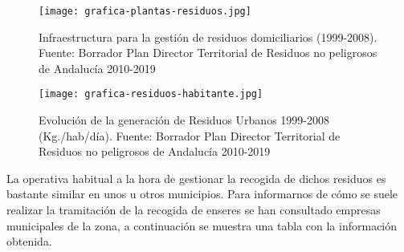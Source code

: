 \begin{figure}[H]
\begin{center}
    \texttt{[image: grafica-plantas-residuos.jpg]}
\end{center}
    \caption{Infraestructura para la gestión de residuos domiciliarios (1999-2008). Fuente: Borrador Plan Director Territorial de Residuos no peligrosos de Andalucía 2010-2019}
\end{figure}

\begin{figure}[H]
\begin{center}
    \texttt{[image: grafica-residuos-habitante.jpg]}
\end{center}
    \caption{Evolución de la generación de Residuos Urbanos 1999-2008 (Kg./hab/día). Fuente: Borrador Plan Director Territorial de Residuos no peligrosos de Andalucía 2010-2019}
\end{figure}

La operativa habitual a la hora de gestionar la recogida de dichos residuos es bastante similar en unos u otros municipios. Para informarnos de cómo se suele realizar la tramitación de la recogida de enseres se han consultado empresas municipales de la zona, a continuación se muestra una tabla con la información obtenida. \\

